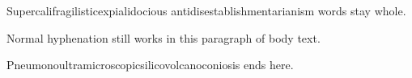 \documentclass{article}
\begin{document}
\nohyphens{Supercalifragilisticexpialidocious antidisestablishmentarianism words stay whole.}

Normal hyphenation still works in this paragraph of body text.

\nohyphens{Pneumonoultramicroscopicsilicovolcanoconiosis ends here.}
\end{document}
